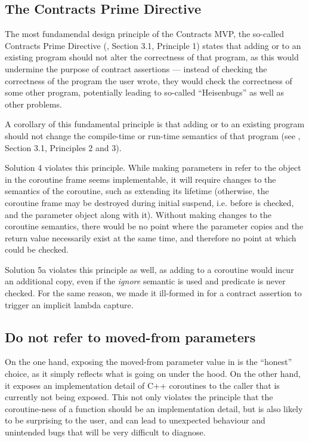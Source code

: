 \subsection{The Contracts Prime Directive}

The most fundamendal design principle of the Contracts MVP, the so-called Contracts Prime Directive (\cite{P2900R8}, Section 3.1, Principle 1) states that adding  or  to an existing program should not alter the correctness of that program, as this would undermine the purpose of contract assertions --- instead of checking the correctness of the program the user wrote, they would check the correctness of some other program, potentially leading to so-called ``Heisenbugs'' as well as other problems.

A corollary of this fundamental principle is that adding  or  to an existing program should not change the compile-time or run-time semantics of that program (see \cite{P2900R8}, Section 3.1, Principles 2 and 3).

Solution 4 violates this principle. While making parameters in  refer to the object in the coroutine frame seems implementable, it will require changes to the semantics of the coroutine, such as extending its lifetime (otherwise, the coroutine frame may be destroyed during initial suspend, i.e. before  is checked, and the parameter object along with it). Without making changes to the coroutine semantics, there would be no point where the parameter copies and the return value necessarily exist at the same time, and therefore no point at which  could be checked.

Solution 5a violates this principle as well, as adding  to a coroutine would incur an additional copy, even if the \emph{ignore} semantic is used and predicate is never checked. For the same reason, we made it ill-formed in \cite{P2900R8} for a contract assertion to trigger an implicit lambda capture.

\subsection{Do not refer to moved-from  parameters}

On the one hand, exposing the moved-from parameter value in  is the ``honest'' choice, as it simply reflects what is going on under the hood. On the other hand, it exposes an implementation detail of C++ coroutines to the caller that is currently not being exposed. This not only violates the principle that the coroutine-ness of a function should be an implementation detail, but is also likely to be surprising to the user, and can lead to unexpected behaviour and unintended bugs that will be very difficult to diagnose.

